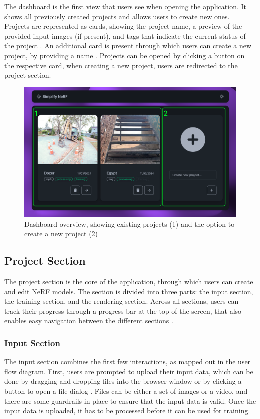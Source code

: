 The dashboard is the first view that users see when opening the application.
It shows all previously created projects and allows users to create new ones.
Projects are represented as cards, showing the project name, a preview of the provided input images (if present), and tags that indicate the current status of the project .
An additional card is present through which users can create a new project, by providing a name .
Projects can be opened by clicking a button on the respective card, when creating a new project, users are redirected to the project section.

\begin{figure}[htb]
  \centering
  \includegraphics[width=.7\textwidth]{figures/view-overview.png}
  \caption{Dashboard overview, showing existing projects (1) and the option to create a new project (2)}
  \label{fig:design:dashboard}
\end{figure}

\subsection*{Project Section}

The project section is the core of the application, through which users can create and edit NeRF models.
The section is divided into three parts: the input section, the training section, and the rendering section.
Across all sections, users can track their progress through a progress bar at the top of the screen, that also enables easy navigation between the different sections .

\subsubsection*{Input Section}

The input section combines the first few interactions, as mapped out in the user flow diagram.
First, users are prompted to upload their input data, which can be done by dragging and dropping files into the browser window or by clicking a button to open a file dialog .
Files can be either a set of images or a video, and there are some guardrails in place to ensure that the input data is valid.
Once the input data is uploaded, it has to be processed before it can be used for training.

